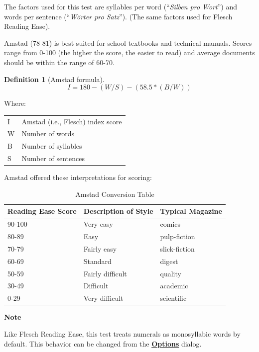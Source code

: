 \documentclass[
]{book}
\newenvironment{notesection}
    {
    \begin{tcolorbox}[colframe=mediumblue,colback=lightblue,coltext=mediumblue,arc=3mm]
    \faLightbulb[regular] \textbf{Note} \newline
    }
    {
    \end{tcolorbox}
    }
\theoremstyle{definition}
\newtheorem{definition}{Definition}[chapter]
\theoremstyle{definition}
\theoremstyle{definition}
\theoremstyle{definition}
\theoremstyle{remark}
\begin{document}
The factors used for this test are syllables per word (``\emph{Silben pro Wort}'') and words per sentence (``\emph{Wörter pro Satz}''). (The same factors used for Flesch Reading Ease).

Amstad (78-81) is best suited for school textbooks and technical manuals. Scores range from 0-100 (the higher the score, the easier to read) and average documents should be within the range of 60-70.

\begin{definition}[Amstad formula]
\protect\hypertarget{def:amstad}{}{\label{def:amstad} {} }\[I = 180 - (W/S) - (58.5*(B/W))\]
\end{definition}

Where:

\begin{longtable}[]{@{}
  >{\raggedright\arraybackslash}p{}
  >{\raggedright\arraybackslash}p{}@{}}
\toprule
\endhead
I & Amstad (i.e., Flesch) index score \\
W & Number of words \\
B & Number of syllables \\
S & Number of sentences \\
\bottomrule
\end{longtable}

Amstad offered these interpretations for scoring:

\begin{table}

\caption{\label{tab:unnamed-chunk-43}Amstad Conversion Table}
\centering
\begin{tabular}[t]{lll}
\toprule
Reading Ease Score & Description of Style & Typical Magazine\\
\midrule
90-100 & Very easy & comics\\
80-89 & Easy & pulp-fiction\\
70-79 & Fairly easy & slick-fiction\\
60-69 & Standard & digest\\
50-59 & Fairly difficult & quality\\
30-49 & Difficult & academic\\
0-29 & Very difficult & scientific\\
\bottomrule
\end{tabular}
\end{table}

\begin{notesection}
Like Flesch Reading Ease, this test treats numerals as monosyllabic words by default. This behavior can be changed from the \protect\hyperlink{readability-test-options}{\textbf{Options}} dialog.

\end{notesection}
\end{document}
